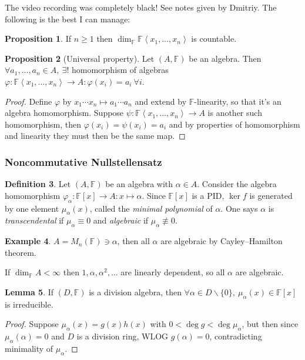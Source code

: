 \documentclass[a4paper]{article}
\newcommand{\la}{\left\langle}
\newcommand{\ra}{\right\rangle}
\newcommand{\F}{\mathbb{F}}
\theoremstyle{definition}
\newtheorem{defn}{Definition}[subsection]
\newtheorem{prop}[defn]{Proposition}
\newtheorem{lemma}[defn]{Lemma}
\newtheorem{example}[defn]{Example}
\begin{document}
The video recording was completely black! See notes given by Dmitriy. The following is the best I can manage:

\begin{prop}
\label{prop:dimFXcountable}
If $n\geq 1$ then $\dim_\F \F\la x_1,\ldots,x_n\ra$ is countable.
\end{prop}

\begin{prop}[Universal property]
Let $(A,\F)$ be an algebra. Then $\forall a_1,\ldots,a_n\in A,\ \exists!$ homomorphism of algebras $\varphi:\F\la x_1,\ldots,x_n\ra\rightarrow A:\varphi(x_i)=a_i \ \forall i$.
\end{prop}
\begin{proof}
Define $\varphi$ by $x_1\cdots x_n\mapsto a_1\cdots a_n$ and extend by $\F$-linearity, so that it's an algebra homomorphism. Suppose $\psi:\F\la x_1,\ldots,x_n\ra\rightarrow A$ is another such homomorphism, then $\varphi(x_i)=\psi(x_i)=a_i$ and by properties of homomorphism and linearity they must then be the same map.
\end{proof}

\subsubsection{Noncommutative Nullstellensatz}
\begin{defn}
Let $(A,\F)$ be an algebra with $\alpha\in A$. Consider the algebra homomorphism $\varphi_\alpha:\F[x]\rightarrow A:x\mapsto\alpha$. Since $\F[x]$ is a PID, $\ker f$ is generated by one element $\mu_\alpha(x)$, called the \textit{minimal polynomial} of $\alpha$. One says $\alpha$ is \textit{transcendental} if $\mu_\alpha\equiv 0$ and \textit{algebraic} if $\mu_\alpha\not\equiv 0$.
\end{defn}
\begin{example}
$A=M_n(\F)\ni\alpha$, then all $\alpha$ are algebraic by Cayley–Hamilton theorem.

If $\dim_\F A<\infty$ then $1,\alpha,\alpha^2,\ldots$ are linearly dependent, so all $\alpha$ are algebraic.
\end{example}

\begin{lemma}
\label{lemma:minpolofdivalgelemisirred}
If $(D,\F)$ is a division algebra, then $\forall\alpha\in D\backslash\{0\},\ \mu_\alpha(x)\in\F[x]$ is irreducible.
\end{lemma}
\begin{proof}
Suppose $\mu_\alpha(x)=g(x)h(x)$ with $0<\deg g<\deg \mu_\alpha$, but then since $\mu_\alpha(\alpha)=0$ and $D$ is a division ring, WLOG $g(\alpha)=0$, contradicting minimality of $\mu_\alpha$.
\end{proof}
\end{document}
